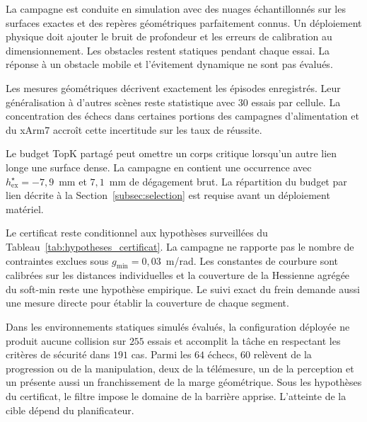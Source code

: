 La campagne est conduite en simulation avec des nuages échantillonnés sur les surfaces exactes et des repères géométriques parfaitement connus. Un déploiement physique doit ajouter le bruit de profondeur et les erreurs de calibration au dimensionnement. Les obstacles restent statiques pendant chaque essai. La réponse à un obstacle mobile et l'évitement dynamique ne sont pas évalués.

Les mesures géométriques décrivent exactement les épisodes enregistrés. Leur généralisation à d'autres scènes reste statistique avec $30$ essais par cellule. La concentration des échecs dans certaines portions des campagnes d'alimentation et du xArm7 accroît cette incertitude sur les taux de réussite.

Le budget TopK partagé peut omettre un corps critique lorsqu'un autre lien longe une surface dense. La campagne en contient une occurrence avec $h_{\mathrm{ex}}^{\star}=-7{,}9$~mm et $7{,}1$~mm de dégagement brut. La répartition du budget par lien décrite à la Section~\ref{subsec:selection} est requise avant un déploiement matériel.

Le certificat reste conditionnel aux hypothèses surveillées du Tableau~\ref{tab:hypotheses_certificat}. La campagne ne rapporte pas le nombre de contraintes exclues sous $g_{\min}=0{,}03$~m/rad. Les constantes de courbure sont calibrées sur les distances individuelles et la couverture de la Hessienne agrégée du soft-min reste une hypothèse empirique. Le suivi exact du frein demande aussi une mesure directe pour établir la couverture de chaque segment.

Dans les environnements statiques simulés évalués, la configuration déployée ne produit aucune collision sur $255$ essais et accomplit la tâche en respectant les critères de sécurité dans $191$ cas. Parmi les $64$ échecs, $60$ relèvent de la progression ou de la manipulation, deux de la télémesure, un de la perception et un présente aussi un franchissement de la marge géométrique. Sous les hypothèses du certificat, le filtre impose le domaine de la barrière apprise. L'atteinte de la cible dépend du planificateur.
